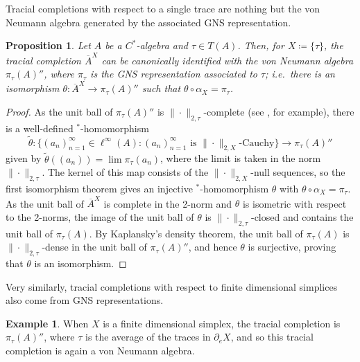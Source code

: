 \documentclass[a4paper,11pt]{amsart}
\newtheorem{proposition}[theorem]{Proposition}
\theoremstyle{definition}
\newtheorem{example}[theorem]{Example}
\numberwithin{equation}{section}
\numberwithin{theorem}{section}
\newcommand{\completion}[2]{\overline{#1}^{#2}}
\begin{document}
Tracial completions with respect to a single trace are nothing but the von Neumann algebra generated by the associated GNS representation.

\begin{proposition}\label{prop:tracialcompletiongns}
Let $A$ be a $C^*$-algebra and $\tau\in T(A)$.  Then, for $X\coloneqq\{\tau\}$, the tracial completion $\completion{A}{X}$ can be canonically identified with the von Neumann algebra $\pi_\tau(A)''$, where $\pi_\tau$ is the GNS representation associated to $\tau$; i.e.\ there is an isomorphism $\theta\colon \completion{A}{X}\to\pi_\tau(A)''$ such that $\theta\circ\alpha_X=\pi_\tau$.
\end{proposition}

\begin{proof}
As the unit ball of $\pi_\tau(A)''$ is $\|\cdot\|_{2,\tau}$-complete (see \cite[Lemma~A.3.3]{Si08}, for example), there is a well-defined $^*$-homomorphism
\begin{equation}
\tilde{\theta}\colon\{(a_n)_{n=1}^\infty \in \ell^\infty(A): (a_n)_{n=1}^\infty \text{ is }\|\cdot\|_{2,X}\text{-Cauchy}\}\to\pi_\tau(A)''
\end{equation}
given by $\tilde{\theta}((a_n))=\lim\pi_\tau(a_n)$, where the limit is taken in the norm $\|\cdot\|_{2,\tau}$.  The kernel of this map consists of the $\|\cdot\|_{2,X}$-null sequences, so the first isomorphism theorem gives an injective $^*$-homomorphism $\theta$ with $\theta \circ \alpha_X = \pi_\tau$.  As the unit ball of $\completion{A}{X}$ is complete in the 2-norm and $\theta$ is isometric with respect to the 2-norms, the image of the unit ball of $\theta$ is $\|\cdot\|_{2, \tau}$-closed and contains the unit ball of $\pi_\tau(A)$.  By Kaplansky's density theorem, the unit ball of $\pi_\tau(A)$ is $\|\cdot\|_{2, \tau}$-dense in the unit ball of $\pi_\tau(A)''$, and hence $\theta$ is surjective, proving that $\theta$ is an isomorphism.
\end{proof}

Very similarly, tracial completions with respect to finite dimensional simplices also come from GNS representations.
\begin{example}
    When $X$ is a finite dimensional simplex, the tracial completion is $\pi_\tau(A)''$, where $\tau$ is the average of the traces in $\partial_e X$, and so this tracial completion is again a von Neumann algebra.
\end{example}
\end{document}
